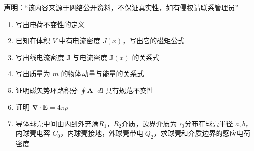 

\textbf{声明}：“该内容来源于网络公开资料，不保证真实性，如有侵权请联系管理员”



\begin{enumerate}
    \item 写出电荷不变性的定义
    \item 已知在体积 $V$ 中有电流密度 $J(x)$，写出它的磁矩公式
    \item 写出线电流密度 $\mathbf{J}$ 与电流密度 $\mathbf{J}(x)$ 的关系式
    \item 写出质量为 $m$ 的物体动量与能量的关系式
    \item 证明磁矢势环路积分 $\oint \mathbf{A} \cdot d\mathbf{l}$ 具有规范不变性
    \item 证明 $\mathbf{\nabla} \cdot \mathbf{E} = 4 \pi \rho$
    \item 导体球壳中间由内到外充满$R_1$，$R_2$介质，边界介质为 $\epsilon_0$分布在球壳半径 $a, b$，内球壳电容 $C_0$，内球壳接地，外球壳带电 $Q_2$，求球壳和介质边界的感应电荷密度
\end{enumerate}


